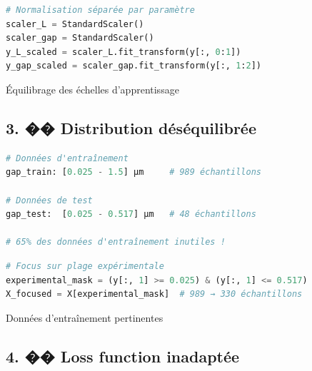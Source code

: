 \documentclass[a4paper,11pt]{article}
\begin{document}
\begin{tcolorbox}[styleSolution,title={Solution}]
\begin{lstlisting}[language=Python]
# Normalisation séparée par paramètre
scaler_L = StandardScaler()
scaler_gap = StandardScaler()
y_L_scaled = scaler_L.fit_transform(y[:, 0:1])
y_gap_scaled = scaler_gap.fit_transform(y[:, 1:2])
\end{lstlisting}
\end{tcolorbox}

\begin{tcolorbox}[styleImpact,title={Impact}]
Équilibrage des échelles d'apprentissage
\end{tcolorbox}

\vspace{1em}

\subsection*{3. �� Distribution déséquilibrée}

\begin{tcolorbox}[styleProblem,title={Problème}]
\begin{lstlisting}[language=Python]
# Données d'entraînement
gap_train: [0.025 - 1.5] µm     # 989 échantillons

# Données de test
gap_test:  [0.025 - 0.517] µm   # 48 échantillons

# 65% des données d'entraînement inutiles !
\end{lstlisting}
\end{tcolorbox}

\begin{tcolorbox}[styleSolution,title={Solution}]
\begin{lstlisting}[language=Python]
# Focus sur plage expérimentale
experimental_mask = (y[:, 1] >= 0.025) & (y[:, 1] <= 0.517)
X_focused = X[experimental_mask]  # 989 → 330 échantillons
\end{lstlisting}
\end{tcolorbox}

\begin{tcolorbox}[styleImpact,title={Impact}]
Données d'entraînement pertinentes
\end{tcolorbox}

\vspace{1em}

\subsection*{4. ��️ Loss function inadaptée}
\end{document}
